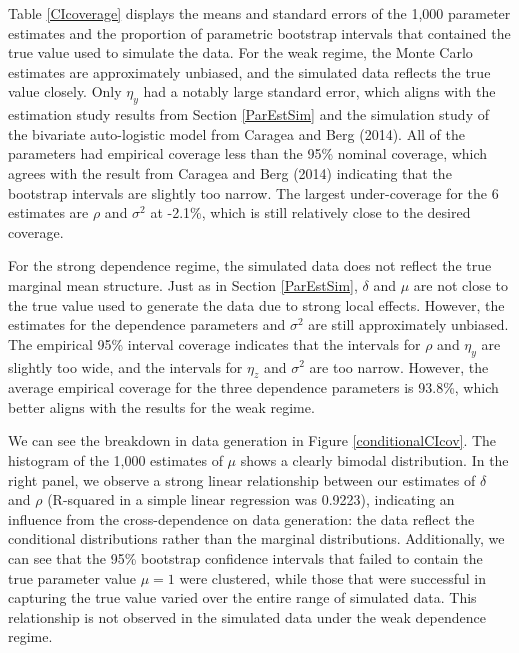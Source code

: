 \documentclass[12pt, a4paper, twoside]{article}
\begin{document}
Table \ref{CIcoverage} displays the means and standard errors of the 1,000 parameter estimates and the proportion of parametric bootstrap intervals that contained the true value used to simulate the data. For the weak regime, the Monte Carlo estimates are approximately unbiased, and the simulated data reflects the true value closely. Only $\eta_y$ had a notably large standard error, which aligns with the estimation study results from Section \ref{ParEstSim} and the simulation study of the bivariate auto-logistic model from Caragea and Berg (2014). All of the parameters had empirical coverage less than the 95\% nominal coverage, which agrees with the result from Caragea and Berg (2014) indicating that the bootstrap intervals are slightly too narrow. The largest under-coverage for the 6 estimates are $\rho$ and $\sigma^2$ at -2.1\%, which is still relatively close to the desired coverage.

For the strong dependence regime, the simulated data does not reflect the true marginal mean structure. Just as in Section \ref{ParEstSim}, $\delta$ and $\mu$ are not close to the true value used to generate the data due to strong local effects. However, the estimates for the dependence parameters and $\sigma^2$ are still approximately unbiased. The empirical 95\% interval coverage indicates that the intervals for $\rho$ and $\eta_y$ are slightly too wide, and the intervals for $\eta_z$ and $\sigma^2$ are too narrow. However, the average empirical coverage for the three dependence parameters is 93.8\%, which better aligns with the results for the weak regime.

We can see the breakdown in data generation in Figure \ref{conditionalCIcov}. The histogram of the 1,000 estimates of $\mu$ shows a clearly bimodal distribution. In the right panel, we observe a strong linear relationship between our estimates of $\delta$ and $\rho$ (R-squared in a simple linear regression was 0.9223), indicating an influence from the cross-dependence on data generation: the data reflect the conditional distributions rather than the marginal distributions. Additionally, we can see that the 95\% bootstrap confidence intervals that failed to contain the true parameter value $\mu=1$ were clustered, while those that were successful in capturing the true value varied over the entire range of simulated data. This relationship is not observed in the simulated data under the weak dependence regime.
\end{document}
